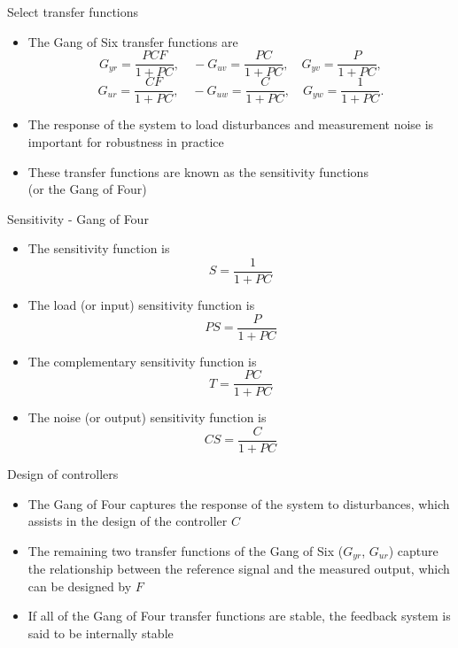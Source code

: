 \documentclass[10pt]{beamer-control}
\begin{document}

\begin{frame}{Select transfer functions}
  \begin{itemize}
    \item The \alert{Gang of Six} transfer functions are
      \begin{equation}
        G_{yr} = \frac{PCF}{1+PC}, \quad -G_{uv} = \frac{PC}{1+PC}, \quad G_{yv} = \frac{P}{1+PC},
      \end{equation}
      \begin{equation}
        G_{ur} = \frac{CF}{1+PC}, \quad -G_{uw} = \frac{C}{1+PC}, \quad G_{yw} = \frac{1}{1+PC}.
      \end{equation}

    \item The response of the system to load disturbances and measurement noise is important for robustness in practice
    \item These transfer functions are known as the sensitivity functions \\ (or the \alert{Gang of Four})
  \end{itemize}
\end{frame}

\begin{frame}{Sensitivity - Gang of Four}
  \begin{itemize}
    \item The sensitivity function is
      \begin{equation}
        S=\frac{1}{1+PC}
      \end{equation}
    \item The load (or input) sensitivity function is
      \begin{equation}
        PS=\frac{P}{1+PC}
      \end{equation}
    \item The complementary sensitivity function is
      \begin{equation}
        T=\frac{PC}{1+PC}
      \end{equation}
    \item The noise (or output) sensitivity function is
      \begin{equation}
        CS = \frac{C}{1+PC}
      \end{equation}
  \end{itemize}
\end{frame}

\begin{frame}{Design of controllers}
  \begin{itemize}
    \item The Gang of Four captures the response of the system to disturbances, which assists in the design of the controller $C$
    \item The remaining two transfer functions of the Gang of Six ($G_{yr}$, $G_{ur}$) capture the relationship between the reference signal and the measured output, which can be designed by $F$
    \item If all of the Gang of Four transfer functions are stable, the feedback system is said to be \alert{internally stable}
  \end{itemize}
\end{frame}
\end{document}
